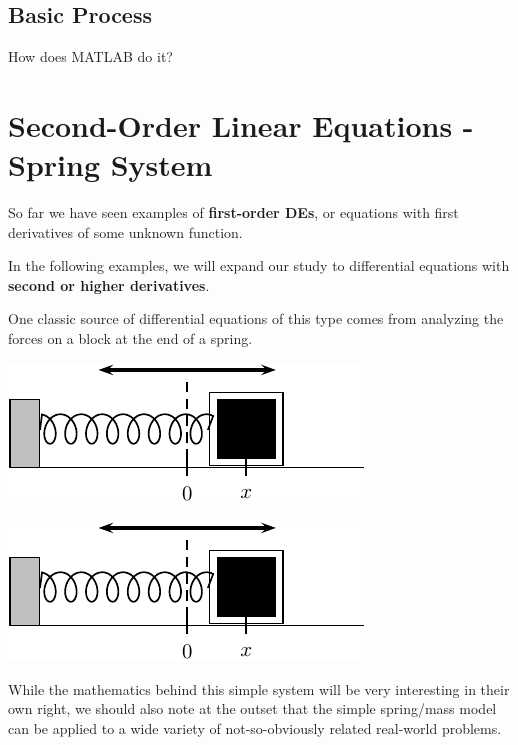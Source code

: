 \newpage

\subsection*{Basic Process}
How does MATLAB do it?
\vfill
\vfill

\newpage

\section*{Second-Order Linear Equations - Spring System}

So far we have seen examples of {\bf first-order DEs}, or equations
with first derivatives of some unknown function.  

In the following examples, we will expand our study to differential
equations with {\bf second or higher derivatives}.

One classic source of differential equations of this type comes from
analyzing the forces on a block at the end of a spring.
\begin{center}
\includegraphics[width=0.5\linewidth]{graphics/notes_08_block}
\end{center}
\newpage
\begin{center}
\includegraphics[width=0.4\linewidth]{graphics/notes_08_block}
\end{center}

While the mathematics behind this simple system will be very
interesting in their own right, we should also note at the outset that
the simple spring/mass model can be applied to a wide variety of
not-so-obviously related real-world problems.

